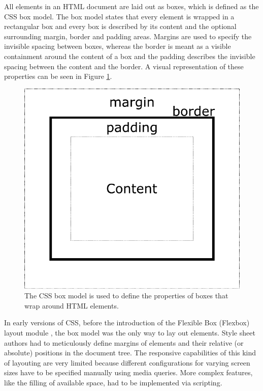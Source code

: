 All elements in an HTML document are laid out as boxes, which is defined as the CSS box model.
The box model states that every element is wrapped in a rectangular box and every box is described by its content and the optional surrounding margin, border and padding areas.
Margins are used to specify the invisible spacing between boxes, whereas the border is meant as a visible containment around the content of a box and the padding describes the invisible spacing between the content and the border. 
A visual representation of these properties can be seen in Figure \ref{fig:BoxModel}.

\begin{figure}[tp]
\centering
\includegraphics[keepaspectratio,width=\linewidth,height=\fullh / 3]{diagrams/box-model.pdf}
\caption[CSS Box Model]{
  The CSS box model is used to define the properties of boxes that wrap around HTML elements.
}
\label{fig:BoxModel}
\end{figure}

In early versions of CSS, before the introduction of the Flexible Box (Flexbox) layout module \parencite{CSSFlexboxFirstDraft}, the box model was the only way to lay out elements. 
Style sheet authors had to meticulously define margins of elements and their relative (or absolute) positions in the document tree. 
The responsive capabilities of this kind of layouting are very limited because different configurations for varying screen sizes have to be specified manually using media queries.
More complex features, like the filling of available space, had to be implemented via scripting.

